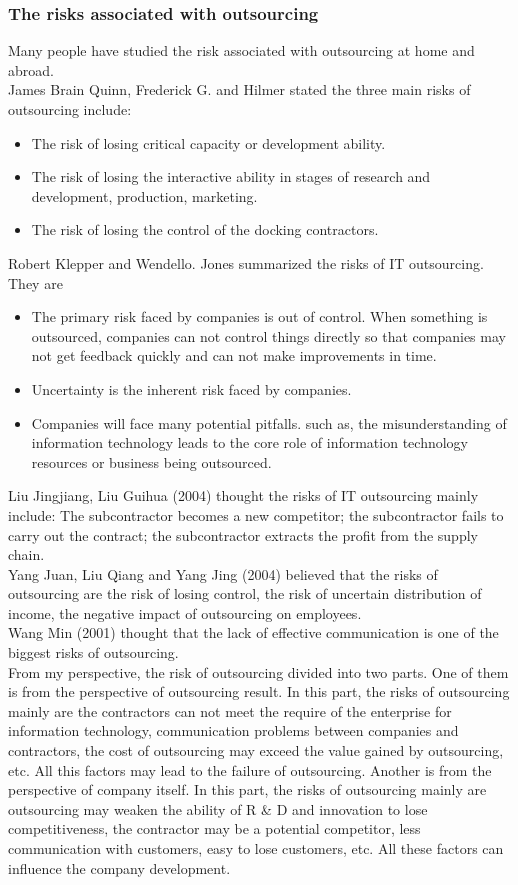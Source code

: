 \documentclass[twocolumn,UTF8]{article}
\begin{document}
\subsubsection{The risks associated with outsourcing}
Many people have studied the risk associated with outsourcing at home and abroad. \\
James Brain Quinn, Frederick G. and Hilmer stated the three main risks of outsourcing include:
\begin{itemize}
\item The risk of losing critical capacity or development ability.
\item The risk of losing the interactive ability in stages of research and development, production, marketing.
\item The risk of losing the control of the docking contractors.
\end{itemize}
Robert Klepper and Wendello. Jones summarized the risks of IT outsourcing. They are
\begin{itemize}
\item The primary risk faced by companies is out of control. When something is outsourced, companies can not control things directly so that companies may not get feedback quickly and can not make improvements in time.
\item Uncertainty is the inherent risk faced by companies.
\item Companies will face many potential pitfalls. such as, the misunderstanding of information technology leads to the core role of information technology resources or business being outsourced.
\end{itemize}
Liu Jingjiang, Liu Guihua (2004) thought the risks of IT outsourcing mainly include:
The subcontractor becomes a new competitor; the subcontractor fails to carry out the contract; the subcontractor extracts the profit from the supply chain. \vspace{6pt} \\
Yang Juan, Liu Qiang and Yang Jing (2004) believed that the risks of outsourcing are the risk of losing control, the risk of uncertain distribution of income, the negative impact of outsourcing on employees.\vspace{6pt} \\
Wang Min (2001) thought that the lack of effective communication is one of the biggest risks of outsourcing.\\

From my perspective, the risk of outsourcing divided into two parts. One of them is from the perspective of outsourcing result. In this part, the risks of outsourcing mainly are the contractors can not meet the require of the enterprise for information technology, communication problems between companies and contractors, the cost of outsourcing may exceed the value gained by outsourcing, etc. All this factors may lead to the failure of outsourcing. Another is from the perspective of company itself. In this part, the risks of outsourcing mainly are outsourcing may weaken the ability of R \& D and innovation to lose competitiveness, the contractor may be a potential competitor, less communication with customers, easy to lose customers, etc. All these factors can influence the company development.
\end{document}
